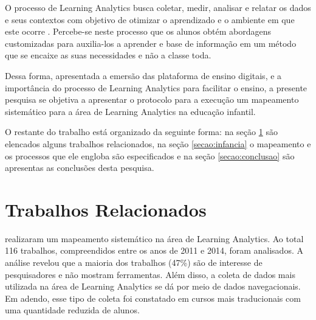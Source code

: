 \documentclass[12pt]{article}
\begin{document}
O processo de Learning Analytics busca coletar, medir, analisar e relatar os dados e seus contextos com objetivo de otimizar o aprendizado e o ambiente em que este ocorre \cite{moissa2015educational}. Percebe-se neste processo que os alunos obtém abordagens customizadas para auxilia-los a aprender e base de informação em um método que se encaixe as suas necessidades e não a classe toda.

Dessa forma, apresentada a emersão das plataforma de ensino digitais, e a importância do processo de Learning Analytics para facilitar o ensino, a presente pesquisa se objetiva a apresentar o protocolo para a execução um mapeamento sistemático para a área de Learning Analytics na educação infantil.

O restante do trabalho está organizado da seguinte forma: na seção \ref{secao:trabalhos} são elencados alguns trabalhos relacionados, na seção \ref{secao:infancia} o mapeamento e os processos que ele engloba são especificados e na seção \ref{secao:conclusao} são apresentas as conclusões desta pesquisa. 


\section{Trabalhos Relacionados}\label{secao:trabalhos}

 realizaram um mapeamento sistemático na área de Learning Analytics. Ao total 116 trabalhos, compreendidos entre os anos de 2011 e 2014, foram analisados. A análise revelou que a maioria dos trabalhos (47\%) são de interesse de pesquisadores e não mostram ferramentas. Além disso, a coleta de dados mais utilizada na área de Learning Analytics se dá por meio de dados navegacionais. Em adendo, esse tipo de coleta foi constatado em cursos mais traducionais com uma quantidade reduzida de alunos. 
\end{document}
